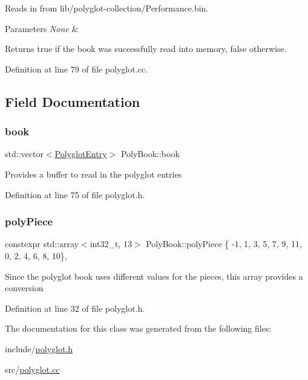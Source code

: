 Reads in from lib/polyglot-\/collection/\+Performance.\+bin. 


\begin{DoxyParams}{Parameters}
{\em None} & \\
\hline
\end{DoxyParams}
\begin{DoxyReturn}{Returns}
true if the book was successfully read into memory, false otherwise. 
\end{DoxyReturn}


Definition at line 79 of file polyglot.\+cc.



\subsection{Field Documentation}
\mbox{\label{classPolyBook_af0e0977de41238bf9b36758ce6b898c1}} 
\subsubsection{\texorpdfstring{book}{book}}
{\footnotesize\ttfamily std\+::vector$<$\mbox{\hyperlink{structPolyglotEntry}{Polyglot\+Entry}}$>$ Poly\+Book\+::book\hspace{0.3cm}{\ttfamily [private]}}

Provides a buffer to read in the polyglot entries 

Definition at line 75 of file polyglot.\+h.

\mbox{\label{classPolyBook_a904f2b4eae9f4a94a11429d47906acd6}} 
\subsubsection{\texorpdfstring{poly\+Piece}{polyPiece}}
{\footnotesize\ttfamily constexpr std\+::array$<$int32\+\_\+t, 13$>$ Poly\+Book\+::poly\+Piece \{ -\/1, 1, 3, 5, 7, 9, 11, 0, 2, 4, 6, 8, 10\}\hspace{0.3cm}{\ttfamily [static]}, {\ttfamily [private]}}

Since the polyglot book uses different values for the pieces, this array provides a conversion 

Definition at line 32 of file polyglot.\+h.



The documentation for this class was generated from the following files\+:\begin{DoxyCompactItemize}
\item 
include/\mbox{\hyperlink{polyglot_8h}{polyglot.\+h}}\item 
src/\mbox{\hyperlink{polyglot_8cc}{polyglot.\+cc}}\end{DoxyCompactItemize}
